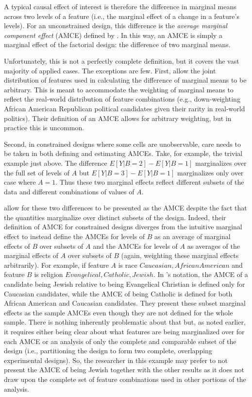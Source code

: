 \documentclass[a4paper,12pt]{article}\usepackage[]{graphicx}\usepackage[]{color}
\begin{document}
A typical causal effect of interest is therefore the difference in marginal means across two levels of a feature (i.e., the marginal effect of a change in a feature's levels). For an unconstrained design, this difference is the \textit{average marginal component effect} (AMCE) defined by \citet{HainmuellerHopkinsYamamoto2014}. In this way, an AMCE is simply a marginal effect of the factorial design: the difference of two marginal means.

Unfortunately, this is not a perfectly complete definition, but it covers the vast majority of applied cases. The exceptions are few. First, \citeauthor{HainmuellerHopkinsYamamoto2014} allow the joint distribution of features used in calculating the difference of marginal means to be arbitrary. This is meant to accommodate the weighting of marginal means to reflect the real-world distribution of feature combinations (e.g., down-weighting African American Republican political candidates given their rarity in real-world politics). Their definition of an AMCE allows for arbitrary weighting, but in practice this is uncommon.

Second, in constrained designs where some cells are unobservable, care needs to be taken in both defining and estimating AMCEs. Take, for example, the trivial example just above. The difference $E[Y|B=2]-E[Y|B=1]$ marginalizes over the full set of levels of $A$ but $E[Y|B=3]-E[Y|B=1]$ marginalizes only over case where $A=1$. Thus these two marginal effects reflect different subsets of the data and different combinations of values of $A$.

\citeauthor{HainmuellerHopkinsYamamoto2014} allow for these two differences to be presented as the AMCE despite the fact that the quantities marginalize over distinct subsets of the design. Indeed, their definition of AMCE for constrained designs diverges from the intuitive marginal effect to instead define the AMCEs for levels of $B$ as an average of marginal effects of $B$ over subsets of $A$ and the AMCEs for levels of $A$ as averages of the marginal effects of $A$ over subsets of $B$ (again, weighting these marginal effects arbitrarily). For example, if feature $A$ is race ${Caucasian, African American}$ and feature $B$ is religion ${Evangelical, Catholic, Jewish}$. In \citeauthor{HainmuellerHopkinsYamamoto2014}'s notation, the AMCE of a candidate being Jewish relative to being Evangelical Christian is defined only for Caucasian candidates, while the AMCE of being Catholic is defined for both African American and Caucasian candidates. They present these subset marginal effects as the sample AMCEs even though they are not defined for the whole sample. There is nothing inherently problematic about that but, as noted earlier, it requires either being clear about what features are being marginalized over for each AMCE or an analysis of only the complete and comparable subset of the design (i.e., partitioning the design to form two complete, overlapping experimental designs). So, the researcher in this example may prefer to not present the AMCE of being Jewish together with the other results as it does not draw upon the complete set of feature combinations used in other portions of the analysis.
\end{document}
